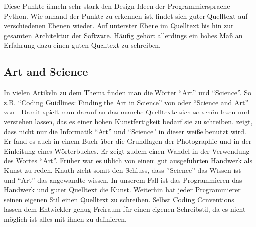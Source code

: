 Diese Punkte ähneln sehr stark den Design Ideen der Programmiersprache Python\cite{Peters}.
Wie anhand der Punkte zu erkennen ist, findet sich guter Quelltext auf verschiedenen Ebenen wieder. Auf unterster Ebene im Quelltext bis hin zur gesamten Architektur der Software. Häufig gehört allerdings ein hohes Maß an Erfahrung dazu einen guten Quelltext zu schreiben.


\subsection{Art and Science}

In vielen Artikeln zu dem Thema finden man die Wörter \enquote{Art} und \enquote{Science}. So z.B.
\enquote{Coding Guidlines: Finding the Art in Science} von \cite{Green} oder \enquote{Science and Art} von \cite[S. 669]{Knuth}.
Damit spielt man darauf an das manche Quelltexte sich so schön lesen und verstehen lassen, das es einer hohen Kunstfertigkeit bedarf sie zu schreiben. \cite[S. 669]{Knuth} zeigt, dass nicht nur die Informatik \enquote{Art} und \enquote{Science} in dieser weiße benutzt wird. Er fand es auch in einem Buch über die Grundlagen der Photographie und in der Einleitung eines Wörterbuches\cite[S. 669]{Knuth}.
Er zeigt zudem einen Wandel in der Verwendung des Wortes \enquote{Art}.
Früher war es üblich von einem gut ausgeführten Handwerk als Kunst zu reden.
Knuth zieht somit den Schluss, dass \enquote{Science} das Wissen ist und \enquote{Art} das angewandte wissen.
In unserem Fall ist das Programmieren das Handwerk und guter Quelltext die Kunst.
Weiterhin hat jeder Programmierer seinen eigenen Stil einen Quelltext zu schreiben.
Selbst Coding Conventions lassen dem Entwickler genug Freiraum für einen eigenen Schreibstil, da es nicht möglich ist alles mit ihnen zu definieren.


